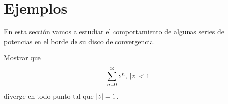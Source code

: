 \chapter{Ejemplos}
\label{cap:ejemplos}


En esta sección vamos a estudiar el comportamiento de algunas series de potencias en el borde de su disco de convergencia.


\begin{example}
    Mostrar que
    \begin{equation*}
        \sum_{n=0}^{\infty} z^n, \, \left\lvert z\right\rvert < 1
    \end{equation*}
    diverge en todo punto tal que $\left\lvert z\right\rvert = 1$.
\end{example}

